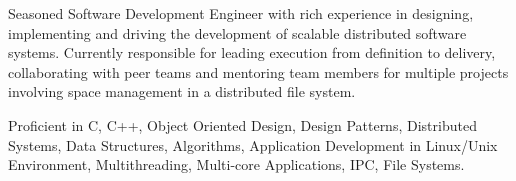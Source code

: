 

\begin{cvparagraph}

 Seasoned Software Development Engineer with rich experience in designing, implementing and driving the development of scalable distributed software systems. Currently responsible for leading execution from definition to delivery, collaborating with peer teams and mentoring team members for multiple projects involving space management in a distributed file system.

 Proficient in C, C++, Object Oriented Design, Design Patterns, Distributed Systems, Data Structures, Algorithms, Application Development in Linux/Unix Environment, Multithreading, Multi-core Applications, IPC, File Systems.
\end{cvparagraph}
